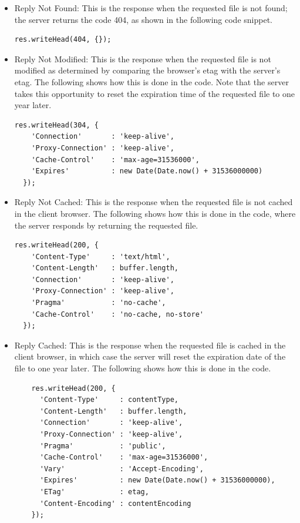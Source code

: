 \begin{itemize}
\item Reply Not Found: This is the response when the requested file is not found; the server returns the code 404, as shown in the following code snippet.

\begin{lstlisting}
res.writeHead(404, {});
\end{lstlisting}

\item Reply Not Modified: This is the response when the requested file is not modified as determined by comparing the browser's etag with the server's etag. The following shows how this is done in the code.  Note that the server takes this opportunity to reset the expiration time of the requested file to one year later. 

\begin{lstlisting}
res.writeHead(304, {
    'Connection'       : 'keep-alive',
    'Proxy-Connection' : 'keep-alive',
    'Cache-Control'    : 'max-age=31536000',
    'Expires'          : new Date(Date.now() + 31536000000)
  });
\end{lstlisting}

\item Reply Not Cached: This is the response when the requested file is not cached in the client browser. The following shows how this is done in the code, where the server responds by returning the requested file.

\begin{lstlisting}
res.writeHead(200, {
    'Content-Type'     : 'text/html',
    'Content-Length'   : buffer.length,
    'Connection'       : 'keep-alive',
    'Proxy-Connection' : 'keep-alive',
    'Pragma'           : 'no-cache',
    'Cache-Control'    : 'no-cache, no-store'
  });
\end{lstlisting}

\item Reply Cached: This is the response when the requested file is cached in the client browser, in which case the server will reset the expiration date of the file to one year later. The following shows how this is done in the code.

\begin{lstlisting}
    res.writeHead(200, {
      'Content-Type'     : contentType,
      'Content-Length'   : buffer.length,
      'Connection'       : 'keep-alive',
      'Proxy-Connection' : 'keep-alive',
      'Pragma'           : 'public',
      'Cache-Control'    : 'max-age=31536000',
      'Vary'             : 'Accept-Encoding',
      'Expires'          : new Date(Date.now() + 31536000000),
      'ETag'             : etag,
      'Content-Encoding' : contentEncoding
    });
\end{lstlisting}

\end{itemize}


